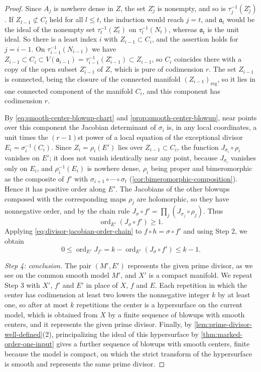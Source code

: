 \begin{proof}
Since $A_j$ is nowhere dense in $Z$, the set $Z^\circ_j$ is nonempty, and so is $\tau_j^{-1}(Z^\circ_j)$. If $Z_{l-1}\not\subset C_l$ held for all $l\leq t$, the induction would reach $j=t$, and $\mathfrak a_t$ would be the ideal of the nonempty set $\tau_t^{-1}(Z^\circ_t)$ on $\tau_t^{-1}(N_t)$, whereas $\mathfrak a_t$ is the unit ideal. So there is a least index $i$ with $Z_{i-1}\subset C_i$, and the assertion holds for $j=i-1$. On $\tau_{i-1}^{-1}(N_{i-1})$ we have $Z_{i-1}\subset C_i\subset V(\mathfrak a_{i-1})=\tau_{i-1}^{-1}(Z^\circ_{i-1})\subset Z_{i-1}$, so $C_i$ coincides there with a copy of the open subset $Z^\circ_{i-1}$ of $Z$, which is pure of codimension $r$. The set $Z_{i-1}$ is connected, being the closure of the connected manifold $(Z_{i-1})_{\mathrm{reg}}$, so it lies in one connected component of the manifold $C_i$, and this component has codimension $r$.

By \eqref{eq:smooth-center-blowup-chart} and \cref{prop:smooth-center-blowup}, near points over this component the Jacobian determinant of $\sigma_i$ is, in any local coordinates, a unit times the $(r-1)$st power of a local equation of the exceptional divisor $E_i=\sigma_i^{-1}(C_i)$. Since $Z_i=\rho_i(E')$ lies over $Z_{i-1}\subset C_i$, the function $J_{\sigma_i}\circ\rho_i$ vanishes on $E'$; it does not vanish identically near any point, because $J_{\sigma_i}$ vanishes only on $E_i$, and $\rho_i^{-1}(E_i)$ is nowhere dense, $\rho_i$ being proper and bimeromorphic as the composite of $f'$ with $\sigma_{i+1}\circ\cdots\circ\sigma_t$ (\cref{cor:bimeromorphic-composition}). Hence it has positive order along $E'$. The Jacobians of the other blowups composed with the corresponding maps $\rho_j$ are holomorphic, so they have nonnegative order, and by the chain rule $J_\sigma\circ f'=\prod_j(J_{\sigma_j}\circ\rho_j)$. Thus
\[
 \operatorname{ord}_{E'}(J_\sigma\circ f')\geq1.
\]
Applying \eqref{eq:divisor-jacobian-order-chain} to $f\circ h=\sigma\circ f'$ and using Step 2, we obtain
\[
 0\leq\operatorname{ord}_{E'}J_{f'}
       =k-\operatorname{ord}_{E'}(J_\sigma\circ f')\leq k-1.
\]

\emph{Step 4: conclusion.} The pair $(M',E')$ represents the given prime divisor, as we see on the common smooth model $M'$, and $X'$ is a compact manifold. We repeat Step 3 with $X'$, $f'$ and $E'$ in place of $X$, $f$ and $E$. Each repetition in which the center has codimension at least two lowers the nonnegative integer $k$ by at least one, so after at most $k$ repetitions the center is a hypersurface on the current model, which is obtained from $X$ by a finite sequence of blowups with smooth centers, and it represents the given prime divisor. Finally, by \cref{lem:prime-divisor-well-defined}(2), principalizing the ideal of this hypersurface by \cref{thm:marked-order-one-input} gives a further sequence of blowups with smooth centers, finite because the model is compact, on which the strict transform of the hypersurface is smooth and represents the same prime divisor.
\end{proof}

